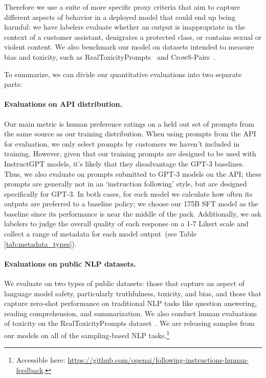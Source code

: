 \documentclass{article}
\begin{document}
Therefore we use a suite of more specific proxy criteria that aim to capture different aspects of behavior in a deployed model that could end up being harmful: we have labelers evaluate whether an output is inappropriate in the context of a customer assistant, denigrates a protected class, or contains sexual or violent content. We also benchmark our model on datasets intended to measure bias and toxicity, such as RealToxicityPrompts~\citep{gehman2020realtoxicityprompts} and CrowS-Pairs~\citep{nangia2020crows}.

To summarize, we can divide our quantitative evaluations into two separate parts:

\paragraph{Evaluations on API distribution.} Our main metric is human preference ratings on a held out set of prompts from the same source as our training distribution. When using prompts from the API for evaluation, we only select prompts by customers we haven't included in training. However, given that our training prompts are designed to be used with InstructGPT models, it's likely that they disadvantage the GPT-3 baselines. Thus, we also evaluate on prompts submitted to GPT-3 models on the API; these prompts are generally not in an `instruction following' style, but are designed specifically for GPT-3. In both cases, for each model we calculate how often its outputs are preferred to a baseline policy; we choose our 175B SFT model as the baseline since its performance is near the middle of the pack. Additionally, we ask labelers to judge the overall quality of each response on a 1-7 Likert scale and collect a range of metadata for each model output~(see Table \ref{tab:metadata_types}).

\paragraph{Evaluations on public NLP datasets.} We evaluate on two types of public datasets: those that capture an aspect of language model safety, particularly truthfulness, toxicity, and bias, and those that capture zero-shot performance on traditional NLP tasks like question answering, reading comprehension, and summarization. We also conduct human evaluations of toxicity on the RealToxicityPrompts dataset~\citep{gehman2020realtoxicityprompts}. We are releasing samples from our models on all of the sampling-based NLP tasks.\footnote{Accessible here: \url{https://github.com/openai/following-instructions-human-feedback}.}
\end{document}
